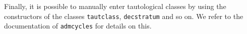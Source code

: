 \documentclass[11pt]{article}
\newcommand{\M}{\ensuremath{\overline{\mathcalorig{M}}}}
\begin{document}
Finally, it is possible to manually enter tautological classes by using the constructors of the classes \verb|tautclass|, \verb|decstratum| and so on. We refer to the documentation of \verb|admcycles| for details on this.
%
%
%
%
%
\end{document}
